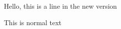 \documentclass{article}
\begin{document}
\Large
Hello, this is a line in the new version

\normalsize
This is normal text
\end{document}
